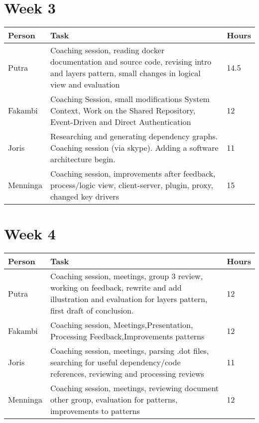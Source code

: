 \section*{Week 3}
\begin{longtable}{p{} p{} p{}}
	\textbf{Person} & \textbf{Task} & \textbf{Hours} \\ \toprule
	Putra           & Coaching session, reading docker documentation and source code, revising intro and layers pattern, small changes in logical view and evaluation & 14.5	\\ \midrule
	Fakambi         & Coaching Session, small modifications System Context, Work on the Shared Repository, Event-Driven and Direct Authentication &	12\\ \midrule
	Joris 			& Researching and generating dependency graphs. Coaching session (via skype). Adding a software architecture begin. & 11 \\ \midrule
	Menninga        & Coaching session, improvements after feedback, process/logic view, client-server, plugin, proxy, changed key drivers & 15 \\ \bottomrule
\end{longtable}

\section*{Week 4}
\begin{longtable}{p{} p{} p{}}
	\textbf{Person} & \textbf{Task} & \textbf{Hours} \\ \toprule
	Putra           & Coaching session, meetings, group 3 review, working on feedback, rewrite and add illustration and evaluation for layers pattern, first draft of conclusion. & 12 \\ \midrule
	Fakambi         & Coaching session, Meetings,Presentation, Processing Feedback,Improvements patterns & 12 \\ \midrule
	Joris 			& Coaching session, meetings, parsing .dot files, searching for useful dependency/code references, reviewing and processing reviews & 11\\ \midrule
	Menninga        & Coaching session, meetings, reviewing document other group, evaluation for patterns, improvements to patterns & 12 \\ \bottomrule
\end{longtable}